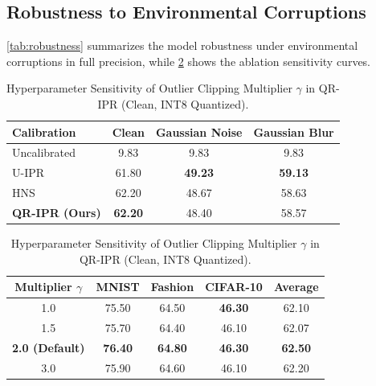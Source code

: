 \documentclass{article}
\theoremstyle{plain}
\theoremstyle{definition}
\theoremstyle{remark}
\begin{document}
\vspace{-2.5mm}
\subsection{Robustness to Environmental Corruptions}
\vspace{-0.3mm}
\cref{tab:robustness} summarizes the model robustness under environmental corruptions in full precision, while \cref{tab:gamma_sweep} shows the ablation sensitivity curves.

\vspace{-1.5mm}
\begin{table}[t]
\begin{minipage}{0.48\linewidth}
\centering
\caption{Robustness Average Accuracy (\%) under Environmental Corruptions (FP32, Task Arithmetic $\lambda=0.5$).}
\label{tab:robustness}
\vspace{-2.5mm}
\begin{scriptsize}
\renewcommand{\arraystretch}{0.78}
\begin{tabular}{lccc}
\toprule
\textbf{Calibration} & \textbf{Clean} & \textbf{Gaussian Noise} & \textbf{Gaussian Blur} \\
\midrule
Uncalibrated & 9.83 & 9.83 & 9.83 \\
U-IPR & 61.80 & \textbf{49.23} & \textbf{59.13} \\
HNS & 62.20 & 48.67 & 58.63 \\
\midrule
\textbf{QR-IPR (Ours)} & \textbf{62.20} & 48.40 & 58.57 \\
\bottomrule
\end{tabular}
\end{scriptsize}
\end{minipage}
\hfill
\begin{minipage}{0.48\linewidth}
\centering
\caption{Hyperparameter Sensitivity of Outlier Clipping Multiplier $\gamma$ in QR-IPR (Clean, INT8 Quantized).}
\label{tab:gamma_sweep}
\vspace{-2.5mm}
\begin{scriptsize}
\renewcommand{\arraystretch}{0.78}
\begin{tabular}{ccccc}
\toprule
\textbf{Multiplier $\gamma$} & \textbf{MNIST} & \textbf{Fashion} & \textbf{CIFAR-10} & \textbf{Average} \\
\midrule
1.0 & 75.50 & 64.50 & \textbf{46.30} & 62.10 \\
1.5 & 75.70 & 64.40 & 46.10 & 62.07 \\
\textbf{2.0 (Default)} & \textbf{76.40} & \textbf{64.80} & \textbf{46.30} & \textbf{62.50} \\
3.0 & 75.90 & 64.60 & 46.10 & 62.20 \\
\bottomrule
\end{tabular}
\end{scriptsize}
\end{minipage}
\end{table}
\vspace{-1.5mm}
\end{document}
